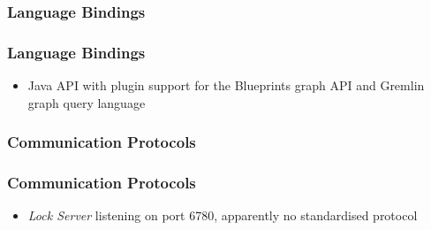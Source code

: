 \subsubsection{Language Bindings} %
\label{ssub:language_bindings}

\begin{frame}
\frametitle{Language Bindings}
\begin{itemize}
	\item Java API with plugin support for the Blueprints graph API and Gremlin graph query language
\end{itemize}
\end{frame}

\subsubsection{Communication Protocols} %
\label{ssub:communication_protocols}

\begin{frame}
\frametitle{Communication Protocols}
\begin{itemize}
	\item \emph{Lock Server} listening on port 6780, apparently no standardised protocol
\end{itemize}
\end{frame}


